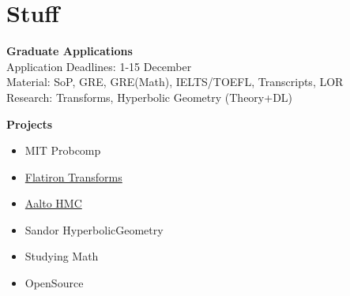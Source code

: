 \section{Stuff}

\noindent \textbf{\Huge Graduate Applications}\\[0.3cm]

\noindent Application Deadlines: 1-15 December\\
\noindent Material: SoP, GRE, GRE(Math), IELTS/TOEFL, Transcripts, LOR\\
\noindent Research: Transforms, Hyperbolic Geometry (Theory+DL)

\noindent \textbf{\Huge Projects}\\[0.3cm]

\begin{itemize}
    \item MIT Probcomp
    \item \hyperref[sec:transforms]{Flatiron Transforms}
    \item \hyperref[sec:aalto-hmc]{Aalto HMC}
    \item Sandor HyperbolicGeometry
    \item Studying Math
    \item OpenSource
\end{itemize}




